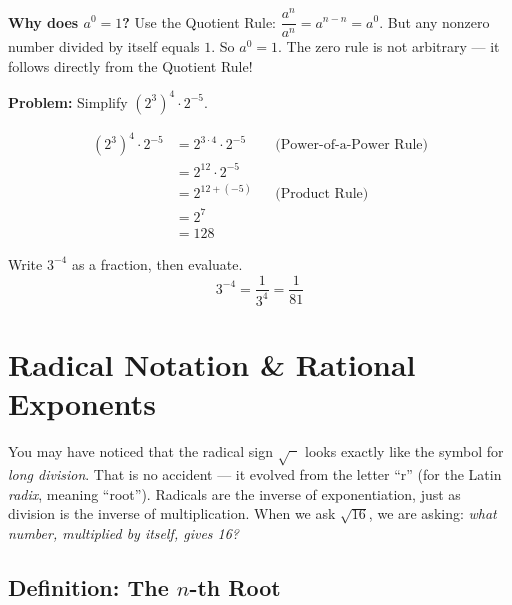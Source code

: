 \documentclass[12pt, letterpaper]{book}
\begin{document}
\bigskip


\begin{storybox}
\textbf{Why does $a^0 = 1$?}\enspace
Use the Quotient Rule: $\dfrac{a^n}{a^n} = a^{n-n} = a^0$.
But any nonzero number divided by itself equals $1$.
So $a^0 = 1$. The zero rule is not arbitrary --- it follows directly from the Quotient Rule!
\end{storybox}

\begin{examplebox}
\textbf{Problem:} Simplify $(2^3)^4 \cdot 2^{-5}$.

\medskip
\begin{align*}
  (2^3)^4 \cdot 2^{-5}
    &= 2^{3 \cdot 4} \cdot 2^{-5}
       && \text{(Power-of-a-Power Rule)}\\
    &= 2^{12} \cdot 2^{-5}
       && \\
    &= 2^{12 + (-5)}
       && \text{(Product Rule)}\\
    &= 2^{7}\\
    &= \boxed{128}
\end{align*}
\end{examplebox}

\begin{examplebox}
Write $3^{-4}$ as a fraction, then evaluate.
\[
  3^{-4} = \frac{1}{3^4} = \frac{1}{81}
\]
\end{examplebox}

\newpage
\section{Radical Notation \& Rational Exponents}

\begin{storybox}
You may have noticed that the radical sign $\sqrt{\phantom{x}}$ looks exactly like
the symbol for \emph{long division}.  That is no accident --- it evolved from the
letter ``r'' (for the Latin \emph{radix}, meaning ``root'').
Radicals are the inverse of exponentiation, just as division is the inverse of
multiplication.  When we ask $\sqrt{16}$, we are asking:
\emph{what number, multiplied by itself, gives 16?}
\end{storybox}

\subsection*{Definition: The $n$-th Root}
\end{document}
